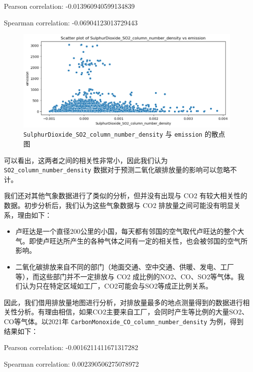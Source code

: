 \documentclass{ctexart}
\begin{document}
\begin{center}
Pearson correlation: -0.013960940599134839

Spearman correlation: -0.06904123013729443
\end{center}


\begin{figure}[H]
      \centering
      \includegraphics[width=1\textwidth]{output1.png}
      \caption{\texttt{SulphurDioxide\_SO2\_column\_number\_density} 与 \texttt{emission} 的散点图}
      \label{fig:1}
\end{figure}

可以看出，这两者之间的相关性非常小，因此我们认为 \texttt{SO2\_column\_number\_density} 数据对于预测二氧化碳排放量的影响可以忽略不计。

我们还对其他气象数据进行了类似的分析，但并没有出现与 CO2 有较大相关性的数据。初步分析后，我们认为这些气象数据与 CO2 排放量之间可能没有明显关系，理由如下：

\begin{itemize}
      \item 卢旺达是一个直径200公里的小国，每天都有邻国的空气取代卢旺达的整个大气。即使卢旺达所产生的各种气体之间有一定的相关性，也会被邻国的空气所影响。
      \item 二氧化碳排放来自不同的部门（地面交通、空中交通、供暖、发电、工厂等），而这些部门并不一定排放与 CO2 成比例的NO2、CO、SO2等气体。我们认为只在特定区域如工厂，CO2可能会与SO2等成正比例关系。
\end{itemize}

因此，我们借用排放量地图进行分析，对排放量最多的地点测量得到的数据进行相关性分析。有理由相信，如果CO2主要来自工厂，会同时产生等比例的大量SO2、CO等气体。以2021年 \texttt{CarbonMonoxide\_CO\_column\_number\_density} 为例，得到结果如下：

\begin{center}
      Pearson correlation: -0.0016211411671317282

      Spearman correlation: 0.002390506275078972
\end{center}
\end{document}
